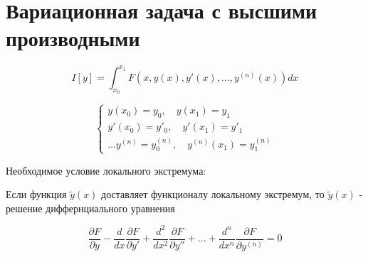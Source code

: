 \documentclass[12pt, a4paper]{report}
\begin{document}
\fi


\section{ Вариационная задача с высшими производными }

\[ I[y ]= \int_{x_0 }^{x_1 } F( x, y (x), y' (x),..., y ^{(n )} (x))  dx\]  

\[ \begin{cases}
    y(x_0) = y_0 ,\quad  y (x_1) = y_1 \\
    y ' (x_0) = y ' _0 , \quad y ' (x_1) = y ' _1 \\
    \ldots 
    y^{(n )} = y^{(n )}_0, \quad y^{(n )} (x_1) = y^{(n )}_1
\end{cases} \]  

Необходимое условие локального экстремума: 

Если функция \( \tilde{y }(x ) \)  доставляет функционалу локальному экстремум, то \( \tilde{ y }(x) \)  - решение диффернциального уравнения

\[ \frac{\partial  F }{\partial  y } - \frac{d}{dx } \frac{ \partial  F }{\partial  y ' } + \frac{d ^2 }{dx ^2 } \frac{\partial  F }{\partial  y ''} + \ldots + \frac{d ^n }{dx ^n } \frac{\partial  F }{\partial  y ^{(n )}} = 0    \] 
\end{document}
